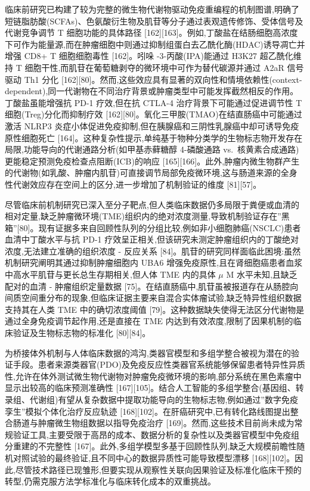 临床前研究已构建了较为完整的微生物代谢物驱动免疫重编程的机制图谱,明确了短链脂肪酸(SCFAs)、色氨酸衍生物及肌苷等分子通过表观遗传修饰、受体信号及代谢竞争调节 T 细胞功能的具体路径 {[}162{]}{[}163{]}。例如,丁酸盐在结肠细胞高浓度下可作为能量源,而在肿瘤细胞中则通过抑制组蛋白去乙酰化酶(HDAC)诱导凋亡并增强 CD8+ T 细胞细胞毒性 {[}162{]}。吲哚 -3-丙酸(IPA)能通过 H3K27 超乙酰化维持 T 细胞干性,而肌苷在葡萄糖剥夺的微环境中可作为替代碳源并通过 A2aR 信号驱动 Th1 分化 {[}162{]}{[}80{]}。然而,这些效应具有显著的双向性和情境依赖性(context-dependent),同一代谢物在不同治疗背景或肿瘤类型中可能发挥截然相反的作用。丁酸盐虽能增强抗 PD-1 疗效,但在抗 CTLA-4 治疗背景下可能通过促进调节性 T 细胞(Treg)分化而抑制疗效 {[}162{]}{[}80{]}。氧化三甲胺(TMAO)在结直肠癌中可能通过激活 NLRP3 炎症小体促进免疫抑制,但在胰腺癌和三阴性乳腺癌中却可诱导免疫原性细胞死亡 {[}164{]}。这种复杂性提示,单纯基于物种分类学的生物标志物开发存在局限,功能导向的代谢通路分析(如甲基赤藓糖醇 4-磷酸通路 vs.~核黄素合成通路)更能稳定预测免疫检查点阻断(ICB)的响应 {[}165{]}{[}166{]}。此外,肿瘤内微生物群产生的代谢物(如乳酸、肿瘤内肌苷)可直接调节局部免疫微环境,这与肠道来源的全身性代谢效应存在空间上的区分,进一步增加了机制验证的维度 {[}81{]}{[}57{]}。

尽管临床前机制研究已深入至分子靶点,但人类临床数据仍多局限于粪便或血清的相对定量,缺乏肿瘤微环境(TME)组织内的绝对浓度测量,导致机制验证存在''黑箱''{[}80{]}。现有证据多来自回顾性队列的分组比较,例如非小细胞肺癌(NSCLC)患者血清中丁酸水平与抗 PD-1 疗效呈正相关,但该研究未测定肿瘤组织内的丁酸绝对浓度,无法建立准确的组织浓度 - 反应关系 {[}84{]}。肌苷的研究同样面临此困境:虽然机制研究阐明其通过抑制肿瘤细胞内 UBA6 增强免疫原性,且在肾细胞癌患者血浆中高水平肌苷与更长总生存期相关,但人体 TME 内的具体 \(\mu\) M 水平未知,且缺乏配对的血清 - 肿瘤组织定量数据 {[}75{]}。在结直肠癌中,肌苷虽被报道存在从肠腔向间质空间重分布的现象,但临床证据主要来自混合实体瘤试验,缺乏特异性组织数据支持其在人类 TME 中的确切浓度阈值 {[}79{]}。这种数据缺失使得无法区分代谢物是通过全身免疫调节起作用,还是直接在 TME 内达到有效浓度,限制了因果机制的临床验证及生物标志物的标准化 {[}80{]}{[}84{]}。

为桥接体外机制与人体临床数据的鸿沟,类器官模型和多组学整合被视为潜在的验证手段。患者来源类器官(PDO)及免疫反应性类器官系统能够保留患者特异性异质性,允许在体外测试微生物代谢物对肿瘤免疫微环境的影响,部分系统在黑色素瘤中显示出较高的临床预测准确性 {[}167{]}{[}105{]}。结合人工智能的多组学整合(基因组、转录组、代谢组)有望从复杂数据中提取功能导向的生物标志物,例如通过''数字免疫孪生''模拟个体化治疗反应轨迹 {[}168{]}{[}102{]}。在肝癌研究中,已有转化路线图提出整合肠道与肿瘤微生物组数据以指导免疫治疗 {[}169{]}。然而,这些技术目前尚未成为常规验证工具,主要受限于高昂的成本、数据分析的复杂性以及类器官模型中免疫组分重建的不完整性 {[}167{]}。此外,多组学模型多基于回顾性队列,缺乏大规模前瞻性随机对照试验的最终验证,且不同中心的数据异质性可能导致模型漂移 {[}168{]}{[}102{]}。因此,尽管技术路径已现雏形,但要实现从观察性关联向因果验证及标准化临床干预的转型,仍需克服方法学标准化与临床转化成本的双重挑战。

